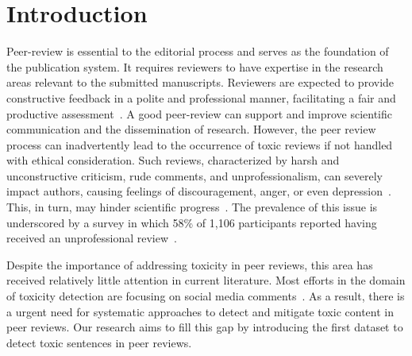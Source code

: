 \section{Introduction}

Peer-review is essential to the editorial process and serves as the foundation of the publication system. 
It requires reviewers to have expertise in the research areas relevant to the submitted manuscripts. Reviewers are expected to provide constructive feedback in a polite and professional manner, facilitating a fair and productive assessment~\cite{mavrogenis2019evaluate,mavrogenis2020good}. 
A good peer-review can support and improve scientific communication and the dissemination of research.
However, the peer review process can inadvertently lead to the occurrence of toxic reviews if not handled with ethical consideration. Such reviews, characterized by harsh and unconstructive criticism, rude comments, and unprofessionalism, can severely impact authors, causing feelings of discouragement, anger, or even depression~\cite{baron1988negative,mavrogenis2020good}. This, in turn, may hinder scientific progress~\citep{ffdd70d0c1784f26aad78a19af959025,gerwing2020quantifying}. 
The prevalence of this issue is underscored by a survey in which 58\% of 1,106 participants reported having received an unprofessional review~\citep{silbiger2019unprofessional}.

Despite the importance of addressing toxicity in peer reviews, this area has received relatively little attention in current literature. Most efforts in the domain of toxicity detection are focusing on social media comments~\cite{cheng2022bias,hosseinmardi2015detection,ghosh2021detoxy,bensalem2024toxic}. As a result, there is a urgent need for systematic approaches to detect and mitigate toxic content in peer reviews.
Our research aims to fill this gap by introducing the first dataset to detect toxic sentences in peer reviews. 

